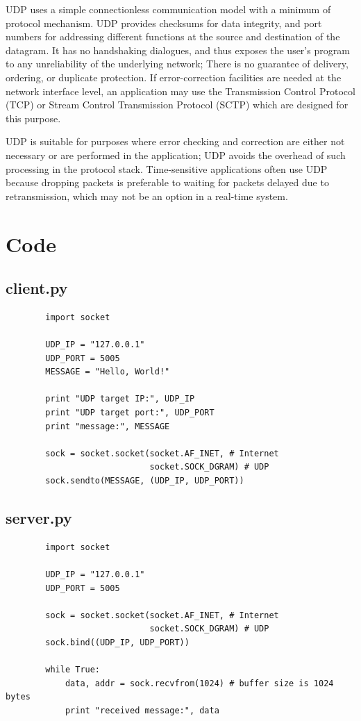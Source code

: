 \documentclass[a4paper,12pt]{article}
\begin{document}
UDP uses a simple connectionless communication model with a minimum of protocol mechanism. UDP provides checksums for data integrity, and port numbers for addressing different functions at the source and destination of the datagram. It has no handshaking dialogues, and thus exposes the user's program to any unreliability of the underlying network; There is no guarantee of delivery, ordering, or duplicate protection. If error-correction facilities are needed at the network interface level, an application may use the Transmission Control Protocol (TCP) or Stream Control Transmission Protocol (SCTP) which are designed for this purpose.
    
UDP is suitable for purposes where error checking and correction are either not necessary or are performed in the application; UDP avoids the overhead of such processing in the protocol stack. Time-sensitive applications often use UDP because dropping packets is preferable to waiting for packets delayed due to retransmission, which may not be an option in a real-time system.    
\section{Code} 
\subsection{client.py}
\begin{verbatim}
        import socket

        UDP_IP = "127.0.0.1"
        UDP_PORT = 5005
        MESSAGE = "Hello, World!"
        
        print "UDP target IP:", UDP_IP
        print "UDP target port:", UDP_PORT
        print "message:", MESSAGE
        
        sock = socket.socket(socket.AF_INET, # Internet
                             socket.SOCK_DGRAM) # UDP
        sock.sendto(MESSAGE, (UDP_IP, UDP_PORT))
\end{verbatim}
\subsection{server.py}
\begin{verbatim}
        import socket

        UDP_IP = "127.0.0.1"
        UDP_PORT = 5005
        
        sock = socket.socket(socket.AF_INET, # Internet
                             socket.SOCK_DGRAM) # UDP
        sock.bind((UDP_IP, UDP_PORT))
        
        while True:
            data, addr = sock.recvfrom(1024) # buffer size is 1024 bytes
            print "received message:", data
\end{verbatim}
    
\end{document}
